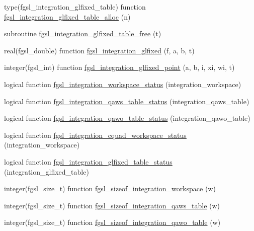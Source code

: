 \begin{DoxyCompactItemize}
\item 
type(fgsl\+\_\+integration\+\_\+glfixed\+\_\+table) function \hyperlink{integration_8finc_a0372516d9af16579e899b6e836da0890}{fgsl\+\_\+integration\+\_\+glfixed\+\_\+table\+\_\+alloc} (n)
\item 
subroutine \hyperlink{integration_8finc_a77c5cbd4335b0305ecd0b6d3a573a309}{fgsl\+\_\+integration\+\_\+glfixed\+\_\+table\+\_\+free} (t)
\item 
real(fgsl\+\_\+double) function \hyperlink{integration_8finc_a1382e36b9f130563b7df1e1b339f3e8d}{fgsl\+\_\+integration\+\_\+glfixed} (f, a, b, t)
\item 
integer(fgsl\+\_\+int) function \hyperlink{integration_8finc_a64e8396fde2c4a8a76192ed6650977f3}{fgsl\+\_\+integration\+\_\+glfixed\+\_\+point} (a, b, i, xi, wi, t)
\item 
logical function \hyperlink{integration_8finc_a42978e91589d08c3af524cec986ce33c}{fgsl\+\_\+integration\+\_\+workspace\+\_\+status} (integration\+\_\+workspace)
\item 
logical function \hyperlink{integration_8finc_a5da0a8440c5f23a14f8b22c5fefb5404}{fgsl\+\_\+integration\+\_\+qaws\+\_\+table\+\_\+status} (integration\+\_\+qaws\+\_\+table)
\item 
logical function \hyperlink{integration_8finc_aa91a1f90a0f43067989a90e651f53dcb}{fgsl\+\_\+integration\+\_\+qawo\+\_\+table\+\_\+status} (integration\+\_\+qawo\+\_\+table)
\item 
logical function \hyperlink{integration_8finc_a1dcdd67510034ad4aa4c3396fe600818}{fgsl\+\_\+integration\+\_\+cquad\+\_\+workspace\+\_\+status} (integration\+\_\+workspace)
\item 
logical function \hyperlink{integration_8finc_a0cfbd26bc06d3740a8f2ed7821fd958f}{fgsl\+\_\+integration\+\_\+glfixed\+\_\+table\+\_\+status} (integration\+\_\+glfixed\+\_\+table)
\item 
integer(fgsl\+\_\+size\+\_\+t) function \hyperlink{integration_8finc_a25f1356cc9307dc2a56993d387fd9460}{fgsl\+\_\+sizeof\+\_\+integration\+\_\+workspace} (w)
\item 
integer(fgsl\+\_\+size\+\_\+t) function \hyperlink{integration_8finc_a78bc5e30c21dd07ef8c02d6674127ad4}{fgsl\+\_\+sizeof\+\_\+integration\+\_\+qaws\+\_\+table} (w)
\item 
integer(fgsl\+\_\+size\+\_\+t) function \hyperlink{integration_8finc_a8690a1322fb1d8384361ef19dac3483d}{fgsl\+\_\+sizeof\+\_\+integration\+\_\+qawo\+\_\+table} (w)
\end{DoxyCompactItemize}


